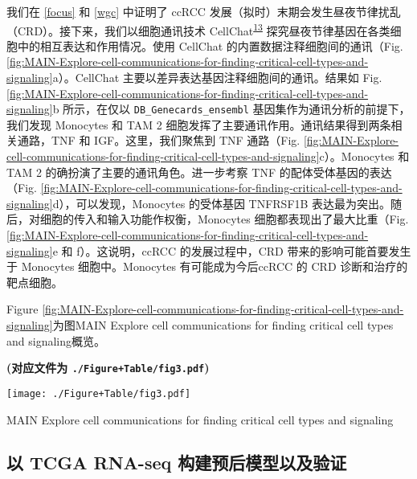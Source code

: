 \documentclass[
]{article}
\begin{document}
我们在 \ref{focus} 和 \ref{wgc} 中证明了 ccRCC 发展（拟时）末期会发生昼夜节律扰乱（CRD）。接下来，我们以细胞通讯技术 CellChat\textsuperscript{\protect\hyperlink{ref-InferenceAndAJinS2021}{13}} 探究昼夜节律基因在各类细胞中的相互表达和作用情况。使用 CellChat 的内置数据注释细胞间的通讯（Fig. \ref{fig:MAIN-Explore-cell-communications-for-finding-critical-cell-types-and-signaling}a）。CellChat 主要以差异表达基因注释细胞间的通讯。结果如 Fig. \ref{fig:MAIN-Explore-cell-communications-for-finding-critical-cell-types-and-signaling}b 所示，在仅以 \texttt{DB\_Genecards\_ensembl} 基因集作为通讯分析的前提下，我们发现 Monocytes 和 TAM 2 细胞发挥了主要通讯作用。通讯结果得到两条相关通路，TNF 和 IGF。这里，我们聚焦到 TNF 通路（Fig. \ref{fig:MAIN-Explore-cell-communications-for-finding-critical-cell-types-and-signaling}c）。Monocytes 和 TAM 2 的确扮演了主要的通讯角色。进一步考察 TNF 的配体受体基因的表达（Fig. \ref{fig:MAIN-Explore-cell-communications-for-finding-critical-cell-types-and-signaling}d），可以发现，Monocytes 的受体基因 TNFRSF1B 表达最为突出。随后，对细胞的传入和输入功能作权衡，Monocytes 细胞都表现出了最大比重（Fig. \ref{fig:MAIN-Explore-cell-communications-for-finding-critical-cell-types-and-signaling}e 和 f）。这说明，ccRCC 的发展过程中，CRD 带来的影响可能首要发生于 Monocytes 细胞中。Monocytes 有可能成为今后ccRCC 的 CRD 诊断和治疗的靶点细胞。

Figure \ref{fig:MAIN-Explore-cell-communications-for-finding-critical-cell-types-and-signaling}为图MAIN Explore cell communications for finding critical cell types and signaling概览。

\textbf{(对应文件为 \texttt{./Figure+Table/fig3.pdf})}

\def\@captype{figure}
\begin{center}
\texttt{[image: ./Figure+Table/fig3.pdf]}
\caption{MAIN Explore cell communications for finding critical cell types and signaling}\label{fig:MAIN-Explore-cell-communications-for-finding-critical-cell-types-and-signaling}
\end{center}

\hypertarget{ux4ee5-tcga-rna-seq-ux6784ux5efaux9884ux540eux6a21ux578bux4ee5ux53caux9a8cux8bc1}{%
\subsection{以 TCGA RNA-seq 构建预后模型以及验证}\label{ux4ee5-tcga-rna-seq-ux6784ux5efaux9884ux540eux6a21ux578bux4ee5ux53caux9a8cux8bc1}}
\end{document}
